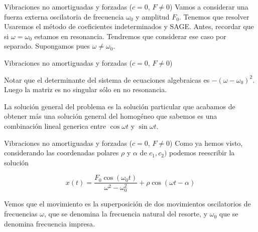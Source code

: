 \documentclass[handout,hyperref={colorlinks=true}]{beamer}
\renewcommand{\emph}[1]{\textcolor[rgb]{1,0,0}{#1}}
\begin{document}
\begin{frame}{ Vibraciones no amortiguadas y forzadas ($c=0$, $F\neq 0$) }
Vamos a considerar una fuerza externa oscilatoria de frecuencia $\omega_0$ y amplitud $F_0$. Tenemos que resolver
Usaremos el método de coeficientes indeterminados y SAGE. Antes, recordar que si $\omega=\omega_0$ estamos en 
resonancia. Tendremos que considerar ese caso por separado. Supongamos pues $\omega\neq\omega_0$.

 

\end{frame}



\begin{frame}{ Vibraciones no amortiguadas y forzadas ($c=0$, $F\neq 0$) }
 

 
Notar que el determinante del sistema de ecuaciones algebraicas es $-(\omega-\omega_0)^2$. Luego la matriz 
es no singular sólo en no resonancia. 

La solución general del problema es la solución particular que acabamos de obtener más una solución 
general del homogéneo que sabemos es una combinación lineal generica entre $\cos \omega t$ y $\sin \omega t$.

 
 
\end{frame}

\begin{frame}{ Vibraciones no amortiguadas y forzadas ($c=0$, $F\neq 0$) }
Como ya hemos visto, considerando las coordenadas polares $\rho$ y $\alpha$ de $c_1,c_2)$
podemos reescribir la solución 


\[x(t)=\frac{F_{0} \cos\left(\omega_{0} t\right)}{\omega^{2} - \omega_{0}^{2}}+
\rho\cos(\omega t-\alpha)
\]

Vemos que el movimiento es la superposición de dos movimientos oscilatorios de frecuencias $\omega$, que se
denomina la \emph{frecuencia natural} del resorte, y $\omega_0$ que se denomina \emph{frecuencia impresa}.
 
\end{frame}

\end{document}
